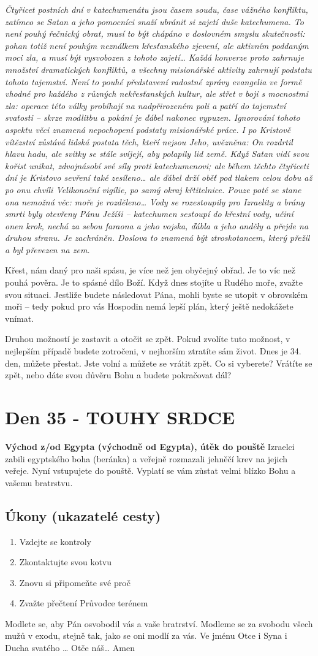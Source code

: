 \documentclass[11pt]{article}
\newcommand{\zacatekPatyTyden}{
  \textbf{Východ z/od Egypta (východně od Egypta), útěk do pouště} \newline
  Izraelci zabili egyptského boha (beránka) a veřejně rozmazali jehněčí krev na jejich veřeje. Nyní vstupujete
  do pouště. Vyplatí se vám zůstat velmi blízko Bohu a vašemu bratrstvu.

\subsection*{Úkony (ukazatelé cesty)}
\begin{enumerate}
  \item Vzdejte se kontroly
  \item Zkontaktujte svou kotvu
  \item Znovu si připomeňte své proč
  \item Zvažte přečtení Průvodce terénem
\end{enumerate}
Modlete se, aby Pán osvobodil vás a vaše bratrství. \newline
Modleme se za svobodu všech mužů v exodu, stejně tak, jako se oni modlí za vás.\newline
Ve jménu Otce i Syna i Ducha svatého …  Otče náš… Amen
}
\begin{document}
\textit{Čtyřicet postních dní v katechumenátu jsou časem soudu, čase vážného konfliktu, zatímco se
Satan a jeho pomocníci snaží ubránit si zajetí duše katechumena. To není pouhý řečnický obrat,
musí to být chápáno v doslovném smyslu skutečnosti: pohan totiž není pouhým neználkem
křesťanského zjevení, ale aktivním poddaným moci zla, a musí být vysvobozen z tohoto zajetí…
Každá konverze proto zahrnuje množství dramatických konfliktů, a všechny misionářské aktivity
zahrnují podstatu tohoto tajemství. Není to pouhé představení radostné zprávy evangelia ve
formě vhodné pro každého z různých nekřesťanských kultur, ale střet v boji s mocnostmi zla:
operace této války probíhají na nadpřirozeném poli a patří do tajemství svatosti – skrze modlitbu
a pokání je ďábel nakonec vypuzen. Ignorování tohoto aspektu věci znamená nepochopení
podstaty misionářské práce. I po Kristově vítězství zůstává lidská postata těch, kteří nejsou Jeho,
uvězněna: On rozdrtil hlavu hadu, ale svitky se stále svíjejí, aby polapily lid země. Když Satan
vidí svou kořist unikat, zdvojnásobí své síly proti katechumenovi; ale během těchto čtyřiceti dní je
Kristovo sevření také zesíleno… ale ďábel drží oběť pod tlakem celou dobu až po onu chvíli
Velikonoční vigílie, po samý okraj křtitelnice. Pouze poté se stane ona nemožná věc: moře je
rozděleno…
Vody se rozestoupily pro Izraelity a brány smrti byly otevřeny Pánu Ježíši – katechumen sestoupí
do křestní vody, učiní onen krok, nechá za sebou faraona a jeho vojska, ďábla a jeho anděly a
přejde na druhou stranu. Je zachráněn. Doslova to znamená být ztroskotancem, který přežil a byl
převezen na zem.}

Křest, nám daný pro naši spásu, je více než jen obyčejný obřad. Je to víc než pouhá pověra. Je to spásné dílo
Boží. Když dnes stojíte u Rudého moře, zvažte svou situaci. Jestliže budete následovat Pána, mohli byste se
utopit v obrovském moři – tedy pokud pro vás Hospodin nemá lepší plán, který ještě nedokážete vnímat.

Druhou možností je zastavit a otočit se zpět. Pokud zvolíte tuto možnost, v nejlepším případě budete
zotročeni, v nejhorším ztratíte sám život. Dnes je 34. den, můžete přestat. Jste volní a můžete se vrátit zpět.
Co si vyberete? Vrátíte se zpět, nebo dáte svou důvěru Bohu a budete pokračovat dál?

\newpage
\section{Den 35 - TOUHY SRDCE}
\zacatekPatyTyden
\end{document}
